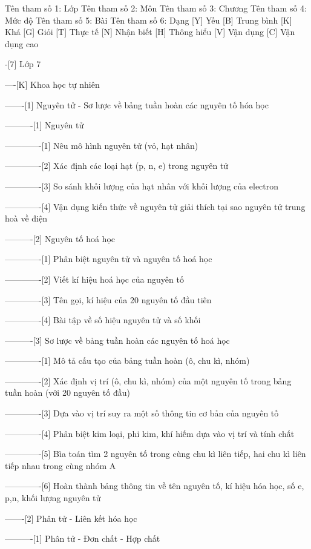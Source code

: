 %
Tên tham số 1: Lớp
Tên tham số 2: Môn
Tên tham số 3: Chương
Tên tham số 4: Mức độ
Tên tham số 5: Bài
Tên tham số 6: Dạng
%
%
[Y] Yếu
[B] Trung bình
[K] Khá
[G] Giỏi
[T] Thực tế
[N] Nhận biết
[H] Thông hiểu
[V] Vận dụng
[C] Vận dụng cao

-[7] Lớp 7

----[K] Khoa học tự nhiên

-------[1] Nguyên tử - Sơ lược về bảng tuần hoàn các nguyên tố hóa học

----------[1] Nguyên tử

-------------[1] Nêu mô hình nguyên tử (vỏ, hạt nhân)

-------------[2] Xác định các loại hạt (p, n, e) trong nguyên tử

-------------[3] So sánh khối lượng của hạt nhân với khối lượng của electron

-------------[4] Vận dụng kiến thức về nguyên tử giải thích tại sao nguyên tử trung hoà về điện

----------[2] Nguyên tố hoá học

-------------[1] Phân biệt nguyên tử và nguyên tố hoá học

-------------[2] Viết kí hiệu hoá học của nguyên tố

-------------[3] Tên gọi, kí hiệu của 20 nguyên tố đầu tiên

-------------[4] Bài tập về số hiệu nguyên tử và số khối

----------[3] Sơ lược về bảng tuần hoàn các nguyên tố hoá học

-------------[1] Mô tả cấu tạo của bảng tuần hoàn (ô, chu kì, nhóm)

-------------[2] Xác định vị trí (ô, chu kì, nhóm) của một nguyên tố trong bảng tuần hoàn (với 20 nguyên tố đầu)

-------------[3] Dựa vào vị trí suy ra một số thông tin cơ bản của nguyên tố

-------------[4] Phân biệt kim loại, phi kim, khí hiếm dựa vào vị trí và tính chất

-------------[5] Bìa toán tìm 2 nguyên tố trong cùng chu kì liên tiếp, hai chu kì liên tiếp nhau trong cùng nhóm A

-------------[6] Hoàn thành bảng thông tin về tên nguyên tố, kí hiệu hóa học, số e, p,n, khối lượng nguyên tử


-------[2] Phân tử - Liên kết hóa học

----------[1] Phân tử - Đơn chất - Hợp chất

